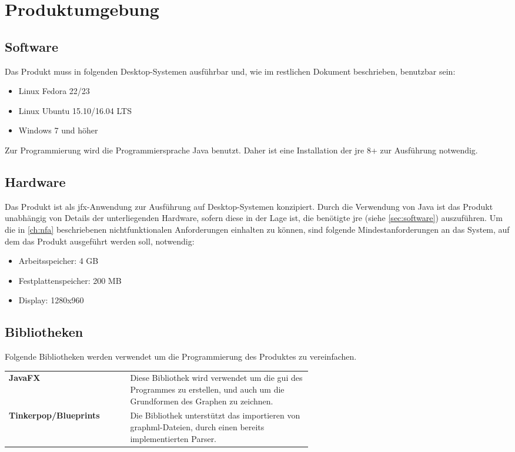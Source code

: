\chapter{Produktumgebung}
\label{ch:umgebung}

\section{Software}\label{sec:software}
Das Produkt muss in folgenden Desktop-Systemen ausführbar und, wie im restlichen Dokument beschrieben, benutzbar sein:
\begin{itemize}
  \setlength\itemsep{0em}
  \item Linux Fedora 22/23
  \item Linux Ubuntu 15.10/16.04 LTS
  \item Windows 7 und höher
\end{itemize}
Zur Programmierung wird die Programmiersprache Java benutzt. Daher ist eine Installation der \gls{jre} 8+ zur Ausführung notwendig.

\section{Hardware}\label{sec:hardware}
Das Produkt ist als \gls{jfx}-Anwendung zur Ausführung auf Desktop-Systemen konzipiert.
Durch die Verwendung von Java ist das Produkt unabhängig von Details der unterliegenden Hardware, sofern diese in der Lage ist, die benötigte \gls{jre} (siehe \autoref{sec:software}) auszuführen.
Um die in \autoref{ch:nfa} beschriebenen nichtfunktionalen Anforderungen einhalten zu können, sind folgende Mindestanforderungen an das System, auf dem das Produkt ausgeführt werden soll, notwendig:

\begin{itemize}
  \setlength\itemsep{0em}
  \item Arbeitsspeicher: 4 GB
  \item Festplattenspeicher: 200 MB 
  \item Display: 1280x960
\end{itemize}

\section{Bibliotheken}\label{sec:bibliotheken}
Folgende Bibliotheken werden verwendet um die Programmierung des Produktes zu vereinfachen. \\

\begin{tabular}{ >{\bfseries}l p{0.6 \linewidth}}
  JavaFX & Diese Bibliothek wird verwendet um die \gls{gui} des Programmes zu erstellen, und auch um die Grundformen des Graphen zu zeichnen. \\
  Tinkerpop/Blueprints & Die Bibliothek unterstützt das importieren von \gls{graphml}-Dateien, durch einen bereits implementierten Parser. \\
\end{tabular}
